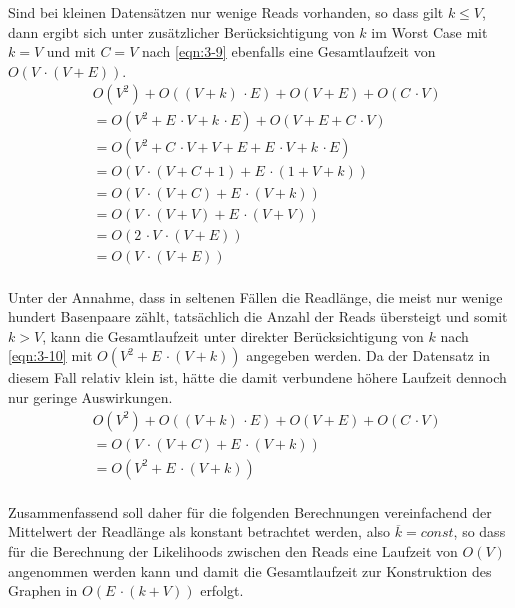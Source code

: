 Sind bei kleinen Datensätzen nur wenige Reads vorhanden, so dass gilt $ k \leq V $, dann ergibt sich unter zusätzlicher Berücksichtigung von $ k $ im Worst Case mit $ k = V $ und mit $ C = V $ nach \eqref{eqn:3-9} ebenfalls eine Gesamtlaufzeit von $ O(V \, \cdotp (V + E)) $.
\begin{equation} \label{eqn:3-9}
\tag{3-9}
\begin{aligned}
&\ {} O(V^2) + O((V + k) \, \cdotp E) + O(V + E) + O(C \, \cdotp V) \\
& \ = O(V^2 + E \, \cdotp V + k \, \cdotp E) + O(V + E + C \, \cdotp V)\\
&\ = O(V^2 + C \, \cdotp V + V + E + E \, \cdotp V + k \, \cdotp E) \\
&\ = O(V \, \cdotp (V + C + 1) + E \, \cdotp (1 + V + k))\\
&\ = O(V \, \cdotp (V + C) + E \, \cdotp (V + k))\\
&\ = O(V \, \cdotp (V + V) + E \, \cdotp (V + V))\\
&\ = O( 2 \, \cdotp V \, \cdotp (V + E))\\
&\ = O(V \, \cdotp (V + E))\\
\end{aligned}
\end{equation}

Unter der Annahme, dass in seltenen Fällen die Readlänge, die meist nur wenige hundert Basenpaare zählt, tatsächlich die Anzahl der Reads übersteigt und somit $ k > V $, kann die Gesamtlaufzeit unter direkter Berücksichtigung von $ k $ nach \eqref{eqn:3-10} mit $ O(V^2 + E \, \cdotp (V + k)) $ angegeben werden. Da der Datensatz in diesem Fall relativ klein ist, hätte die damit verbundene höhere Laufzeit dennoch nur geringe Auswirkungen.
\begin{equation} \label{eqn:3-10}
\tag{3-10}
\begin{aligned}
&\ {} O(V^2) + O((V + k) \, \cdotp E) + O(V + E) + O(C \, \cdotp V) \\
&\ = O(V \, \cdotp (V + C) + E \, \cdotp (V + k))\\
&\ = O(V^2 + E \, \cdotp (V + k))\\
\end{aligned}
\end{equation}

Zusammenfassend soll daher für die folgenden Berechnungen vereinfachend der Mittelwert der Readlänge als konstant betrachtet werden, also $\overline{k}=const$, so dass für die Berechnung der Likelihoods zwischen den Reads eine Laufzeit von $ O(V) $ angenommen werden kann und damit die Gesamtlaufzeit zur Konstruktion des Graphen in $ O(E\, \cdotp (k + V)) $ erfolgt.
